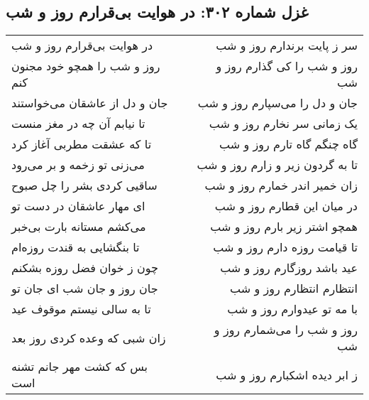 \begin{center}
\section*{غزل شماره ۳۰۲: در هوایت بی‌قرارم روز و شب}
\label{sec:0302}
\begin{longtable}{l p{0.5cm} r}
در هوایت بی‌قرارم روز و شب
&&
سر ز پایت برندارم روز و شب
\\
روز و شب را همچو خود مجنون کنم
&&
روز و شب را کی گذارم روز و شب
\\
جان و دل از عاشقان می‌خواستند
&&
جان و دل را می‌سپارم روز و شب
\\
تا نیابم آن چه در مغز منست
&&
یک زمانی سر نخارم روز و شب
\\
تا که عشقت مطربی آغاز کرد
&&
گاه چنگم گاه تارم روز و شب
\\
می‌زنی تو زخمه و بر می‌رود
&&
تا به گردون زیر و زارم روز و شب
\\
ساقیی کردی بشر را چل صبوح
&&
زان خمیر اندر خمارم روز و شب
\\
ای مهار عاشقان در دست تو
&&
در میان این قطارم روز و شب
\\
می‌کشم مستانه بارت بی‌خبر
&&
همچو اشتر زیر بارم روز و شب
\\
تا بنگشایی به قندت روزه‌ام
&&
تا قیامت روزه دارم روز و شب
\\
چون ز خوان فضل روزه بشکنم
&&
عید باشد روزگارم روز و شب
\\
جان روز و جان شب ای جان تو
&&
انتظارم انتظارم روز و شب
\\
تا به سالی نیستم موقوف عید
&&
با مه تو عیدوارم روز و شب
\\
زان شبی که وعده کردی روز بعد
&&
روز و شب را می‌شمارم روز و شب
\\
بس که کشت مهر جانم تشنه است
&&
ز ابر دیده اشکبارم روز و شب
\\
\end{longtable}
\end{center}
